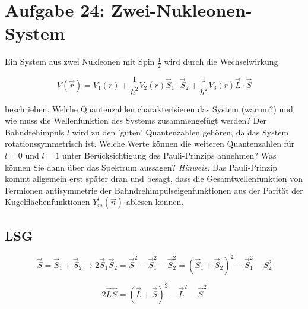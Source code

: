 




\section*{Aufgabe 24: Zwei-Nukleonen-System}

Ein System aus zwei Nukleonen mit Spin \(\frac{1}{2}\) wird durch die Wechselwirkung

\[ V(\vec r) = V_1(r) + \frac{1}{\hbar^2}V_2(r)\vec S_1\cdot \vec S_2 +  \frac{1}{\hbar^2}V_3(r)\vec L\cdot\vec S\]

beschrieben. Welche Quantenzahlen charakterisieren das System (warum?) und wie muss die Wellenfunktion des Systems zusammengefügt werden? Der Bahndrehimpuls \(l\) wird zu den 'guten' Quantenzahlen gehören, da das System rotationssymmetrisch ist. Welche Werte können die weiteren Quantenzahlen für \(l=0\) und \(l=1\) unter Berücksichtigung des Pauli-Prinzips annehmen? Was können Sie dann über das Spektrum aussagen?
\textit{Hinweis:} Das Pauli-Prinzip kommt allgemein erst später dran und besagt, dass die Gesamtwellenfunktion von Fermionen antisymmetrie der Bahndrehimpulseigenfunktionen aus der Parität der Kugelflächenfunktionen \(Y^l_m(\vec n)\) ablesen können.

\subsection*{LSG}




\[\vec S = \vec S_1 + \vec S_2\rightarrow 2\vec S_1\vec S_2 = \vec S^2-\vec S_1^2-\vec S_2^2 = (\vec S_1+\vec S_2)^2-\vec S_1^2-S_2^2\]

\[2\vec L \vec S = (\vec L+\vec S)^2 -\vec L^2-\vec S^2\]

